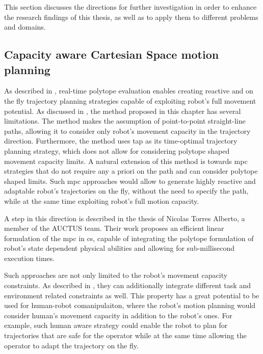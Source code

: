 This section discusses the directions for further investigation in order to enhance the research findings of this thesis, as well as to apply them to different problems and domains. 

\subsection{Capacity aware Cartesian Space motion planning}

As described in , real-time polytope evaluation enables creating reactive and on the fly trajectory planning strategies capable of exploiting robot's full movement potential. As discussed in , the method proposed in this chapter has several limitations. The method makes the assumption of point-to-point straight-line paths, allowing it to consider only robot's movement capacity in the trajectory direction. Furthermore, the method uses \gls{tap} as its time-optimal trajectory planning strategy, which does not allow for considering polytope shaped movement capacity limits. A natural extension of this method is towards \gls{mpc} strategies that do not require any a priori on the path and can consider polytope shaped limits. Such \gls{mpc} approaches would allow to generate highly reactive and adaptable robot's trajectories on the fly, without the need to specify the path, while at the same time exploiting robot's full motion capacity. 

A step in this direction is described in the thesis of Nicolas Torres Alberto, a member of the AUCTUS team. Their work proposes an efficient linear formulation of the \gls{mpc} in \gls{cs}, capable of integrating the polytope formulation of robot's state dependent physical abilities and allowing for sub-millisecond execution times.

Such approaches are not only limited to the robot's movement capacity constraints. As described in , they can additionally integrate different task and environment related constraints as well. This property has a great potential to be used for human-robot comanipulaiton, where the robot's motion planning would consider human's movement capacity in addition to the robot's ones. For example, such human aware strategy could enable the robot to plan for trajectories that are safe for the operator while at the same time allowing the operator to adapt the trajectory on the fly.




